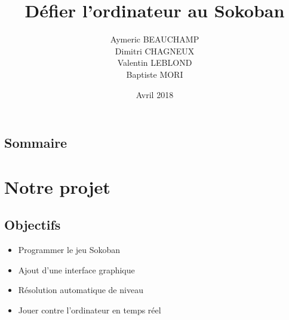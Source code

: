 \documentclass{beamer}
\title{Défier l'ordinateur au Sokoban}
\author{Aymeric BEAUCHAMP\\Dimitri CHAGNEUX\\Valentin LEBLOND\\Baptiste MORI}
\date{Avril 2018}
\begin{document}
\maketitle
\section*{}
\subsection*{Sommaire}
\frame{\tableofcontents}

\section{Notre projet}

\subsection{Objectifs}
\begin{frame}
\begin{itemize}
\item Programmer le jeu Sokoban
\item Ajout d'une interface graphique
\item Résolution automatique de niveau
\item Jouer contre l'ordinateur en temps réel
\end{itemize}
\end{frame}
\end{document}
